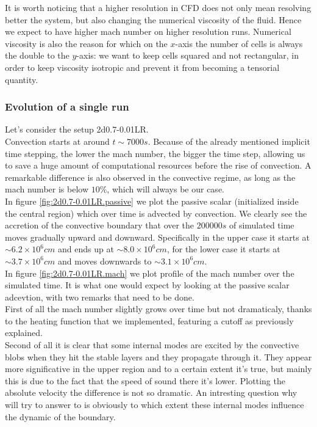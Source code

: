 It is worth noticing that a higher resolution in CFD does not only mean resolving better the system, but also changing the numerical viscosity of the fluid. Hence we expect to have higher mach number on higher resolution runs.
Numerical viscosity is also the reason for which on the $x$-axis the number of cells is always the double to the $y$-axis: we want to keep cells squared and not rectangular, in order to keep viscosity isotropic and prevent it from becoming a tensorial quantity. \\

\subsubsection{Evolution of a single run}
Let's consider the setup 2d0.7-0.01LR. \\
Convection starts at around $t \sim 7000 s$. Because of the already mentioned implicit time stepping, the lower the mach number, the bigger the time step, allowing us to save a huge amount of computational resources before the rise of convection. A remarkable difference is also observed in the convective regime, as long as the mach number is below $10 \%$, which will always be our case. \\
In figure \ref{fig:2d0.7-0.01LR.passive} we plot the passive scalar (initialized inside the central region) which over time is advected by convection. We clearly see the accretion of the convective boundary that over the $200000 s$ of simulated time moves gradually upward and downward. Specifically in the upper case it starts at $\sim 6.2 \times 10^{6} cm $ and ends up at $\sim 8.0 \times 10^{6} cm$, for the lower case it starts at $\sim 3.7 \times 10^{6} cm$ and moves downwards to $\sim 3.1 \times 10^{6} cm$. \\
In figure \ref{fig:2d0.7-0.01LR.mach} we plot profile of the mach number over the simulated time. It is what one would expect by looking at the passive scalar adcevtion, with two remarks that need to be done. \\
First of all the mach number slightly grows over time but not dramaticaly, thanks to the heating function that we implemented, featuring a cutoff as previously explained. \\
Second of all it is clear that some internal modes are excited by the convective blobs when they hit the stable layers and they propagate through it. They appear more significative in the upper region and to a certain extent it's true, but mainly this is due to the fact that the speed of sound there it's lower. Plotting the absolute velocity the difference is not so dramatic. An intresting question why will try to answer to is obviously to which extent these internal modes influence the dynamic of the boundary. \\

